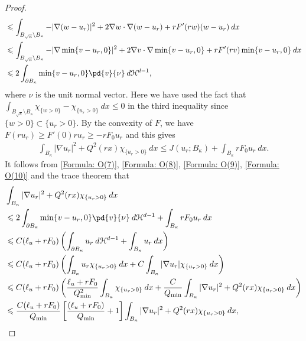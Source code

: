 \documentclass[11pt,reqno]{amsart}
\begin{document}
\begin{proof}
\begin{align}
\begin{alignedat}{5}
    		&\leqslant\int_{B_{\sqrt{\kappa}}\setminus B_{\kappa}}-|\nabla(w-u_{r})|^{2}+2\nabla w\cdot\nabla(w-u_{r})+rF'(rw)(w-u_{r})\:dx\\
    		&\leqslant\int_{B_{\sqrt{\kappa}}\setminus B_{\kappa}}-|\nabla\min\{v-u_{r},0\}|^{2}+2\nabla v\cdot\nabla\min\{v-u_{r},0\}+rF'(rv)\min\{v-u_{r},0\}\:dx\\
    		&\leqslant2\int_{\partial B_{\kappa}}\min\{v-u_{r},0\}\pd{v}{\nu}\:d\mathcal{H}^{d-1},
    	\end{alignedat}
    \end{align}
    where $\nu$ is the unit normal vector. Here we have used the fact that $\int_{B_{\sqrt{\kappa}}\setminus B_{\kappa}}\chi_{\{w>0\}}-\chi_{\{u_{r}>0\}}\:dx\leqslant0$ in the third inequality since $\{w>0\}\subset\{u_{r}>0\}$. By the convexity of $F$, we have $F(ru_{r})\geqslant F'(0)ru_{r}\geqslant-rF_{0}u_{r}$ and this gives
    \begin{align}\label{Formula: O(10)}
    	\int_{B_{\kappa}}|\nabla u_{r}|^{2}+Q^{2}(rx)\chi_{\{u_{r}>0\}}\:dx\leqslant J(u_{r};B_{\kappa})+\int_{B_{\kappa}}rF_{0}u_{r}\:dx.
    \end{align}
    It follows from \eqref{Formula: O(7)}, \eqref{Formula: O(8)}, \eqref{Formula: O(9)}, \eqref{Formula: O(10)} and the trace theorem that
    \begin{align}\label{Formula: O(11)}
    	\begin{alignedat}{5}
    		&\int_{B_{\kappa}}|\nabla u_{r}|^{2}+Q^{2}(rx)\chi_{\{u_{r}>0\}}\:dx\\
    		&\leqslant2\int_{\partial B_{\kappa}}\min\{v-u_{r},0\}\pd{v}{\nu}\:d\mathcal{H}^{d-1}+\int_{B_{\kappa}}rF_{0}u_{r}\:dx\\
    		&\leqslant C(\ell_{u}+rF_{0})\left(\int_{\partial B_{\kappa}}u_{r}\:d\mathcal{H}^{d-1}+\int_{B_{\kappa}}u_{r}\:dx\right)\\
    		&\leqslant C(\ell_{u}+rF_{0})\left(\int_{B_{\kappa}}u_{r}\chi_{\{u_{r}>0\}}\:dx+C\int_{B_{\kappa}}|\nabla u_{r}|\chi_{\{u_{r}>0\}}\:dx\right)\\
    		&\leqslant C(\ell_{u}+rF_{0})\left(\frac{\ell_{u}+rF_{0}}{Q_{\mathrm{min}}^{2}}\int_{B_{\kappa}}\chi_{\{u_{r}>0\}}\:dx+\frac{C}{Q_{\mathrm{min}}}\int_{B_{\kappa}}|\nabla u_{r}|^{2}+Q^{2}(rx)\chi_{\{u_{r}>0\}}\:dx\right)\\
    		&\leqslant\frac{C(\ell_{u}+rF_{0})}{Q_{\mathrm{min}}}\left[\frac{(\ell_{u}+rF_{0})}{Q_{\mathrm{min}}}+1\right]\int_{B_{\kappa}}|\nabla u_{r}|^{2}+Q^{2}(rx)\chi_{\{u_{r}>0\}}\:dx,
    	\end{alignedat}

\end{align}
\end{proof}
\end{document}
